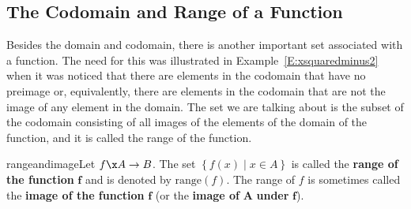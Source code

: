 \subsection*{The Codomain and Range of a Function}
Besides the domain and codomain, there is another important set associated with a function.  The need for this was illustrated in Example~\ref{E:xsquaredminus2} when it was noticed that there are elements in the codomain that have no preimage or, equivalently, there are elements in the codomain that are not the image of any element in the domain.  The set we are talking about is the subset of the codomain consisting of all images of the elements of the domain of the function, and it is called the range of the function.
%
\begin{defbox}{rangeandimage}{Let  $f\x A \to B$.  The set  
$\left\{ {f( x ) \mid x \in A} \right\}$  is called the \textbf{range of the function}
%
%
  $\boldsymbol{f}$  and is denoted by  $\text{range}\left( f \right)$\!. \label{sym:rangef}  The range of  $f$  is sometimes called the \textbf{image of the function}  $\boldsymbol{f}$ (or the \textbf{image of} 
$\boldsymbol{A}$ \textbf{under} $\boldsymbol{f}$).}
\end{defbox}

